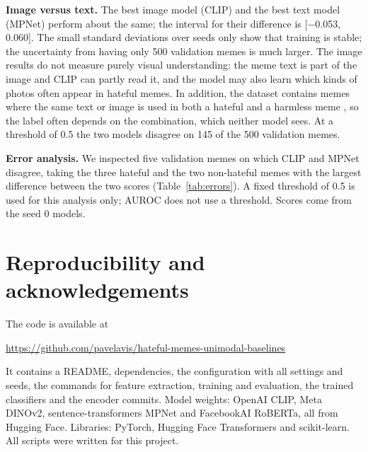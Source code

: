 \documentclass[compactaffiliation]{Interspeech}
\begin{document}
\textbf{Image versus text.} The best image model (CLIP) and the best text model (MPNet) perform about
the same; the interval for their difference is [$-$0.053, 0.060]. The small standard deviations over
seeds only show that training is stable; the uncertainty from having only 500 validation memes is
much larger. The image results do not measure purely visual understanding: the meme text is part of
the image and CLIP can partly read it, and the model may also learn which kinds of photos often
appear in hateful memes. In addition, the dataset contains memes where the same text or image is
used in both a hateful and a harmless meme \cite{kiela2020hateful}, so the label often depends on
the combination, which neither model sees. At a threshold of 0.5 the two models disagree on 145 of
the 500 validation memes.

\textbf{Error analysis.} We inspected five validation memes on which CLIP and MPNet disagree, taking
the three hateful and the two non-hateful memes with the largest difference between the two scores
(Table~\ref{tab:errors}). A fixed threshold of 0.5 is used for this analysis only; AUROC does not
use a threshold. Scores come from the seed 0 models.



\section{Reproducibility and acknowledgements}
The code is available at
\begin{center}\vspace{-2mm}\small\url{https://github.com/pavelavis/hateful-memes-unimodal-baselines}\vspace{-2mm}\end{center}
It contains a README, dependencies, the configuration with all settings and seeds, the commands for
feature extraction, training and evaluation, the trained classifiers and the encoder commits. Model
weights: OpenAI CLIP, Meta DINOv2, sentence-transformers MPNet and FacebookAI RoBERTa, all from
Hugging Face. Libraries: PyTorch, Hugging Face Transformers and scikit-learn. All scripts were
written for this project.



\end{document}
